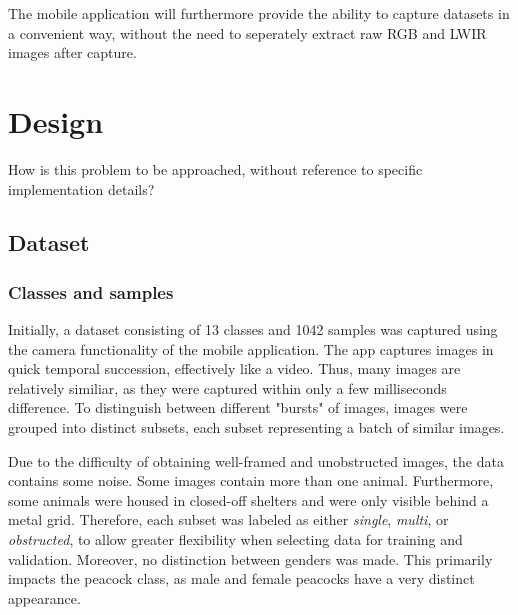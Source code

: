 \documentclass{l4proj}
\begin{document}
The mobile application will furthermore provide the ability to capture datasets in a convenient way, without the need to seperately extract raw RGB and LWIR images after capture.


\chapter{Design}
How is this problem to be approached, without reference to specific implementation details? 


\section{Dataset}

\subsection{Classes and samples}
\label{classes_samples}

Initially, a dataset consisting of 13 classes and 1042 samples was captured using the camera functionality of the mobile application. The app captures images in quick temporal succession, effectively like a video. Thus, many images are relatively similiar, as they were captured within only a few milliseconds difference. To distinguish between different "bursts" of images, images were grouped into distinct subsets, each subset representing a batch of similar images.

Due to the difficulty of obtaining well-framed and unobstructed images, the data contains some noise. Some images contain more than one animal. Furthermore, some animals were housed in closed-off shelters and were only visible behind a metal grid. Therefore, each subset was labeled as either \textit{single}, \textit{multi}, or \textit{obstructed}, to allow greater flexibility when selecting data for training and validation. Moreover, no distinction between genders was made. This primarily impacts the peacock class, as male and female peacocks have a very distinct appearance.
\end{document}
